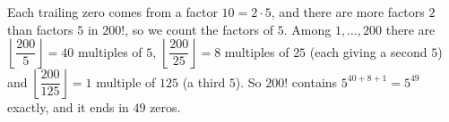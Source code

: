 Each trailing zero comes from a factor $10=2\cdot5$, and there are more factors $2$ than factors $5$ in $200!$, so we count the factors of $5$. Among $1,\dots,200$ there are $\left\lfloor\dfrac{200}{5}\right\rfloor=40$ multiples of $5$, $\left\lfloor\dfrac{200}{25}\right\rfloor=8$ multiples of $25$ (each giving a second $5$) and $\left\lfloor\dfrac{200}{125}\right\rfloor=1$ multiple of $125$ (a third $5$). So $200!$ contains $5^{40+8+1}=5^{49}$ exactly, and it ends in $\boxed{49}$ zeros.
